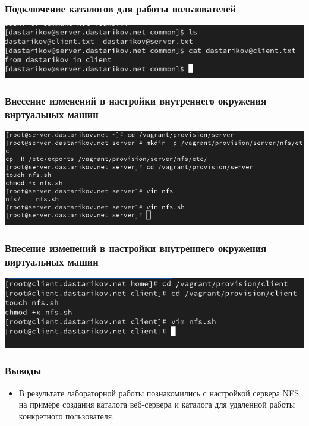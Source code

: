 \begin{frame}
\frametitle{Подключение каталогов для работы пользователей}
    \includegraphics[width=\textwidth]{../images/image25.png}
\end{frame}


\begin{frame}
\frametitle{Внесение изменений в настройки внутреннего окружения виртуальных машин}
    \includegraphics[width=\textwidth]{../images/image26.png}
\end{frame}

\begin{frame}
\frametitle{Внесение изменений в настройки внутреннего окружения виртуальных машин}
    \includegraphics[width=\textwidth]{../images/image27.png}
\end{frame}

\begin{frame}
\frametitle{Выводы}
\begin{itemize}
    \item В результате лабораторной работы познакомились с настройкой сервера NFS на примере создания каталога веб-сервера и каталога для удаленной работы конкретного пользователя.
\end{itemize}
\end{frame}

